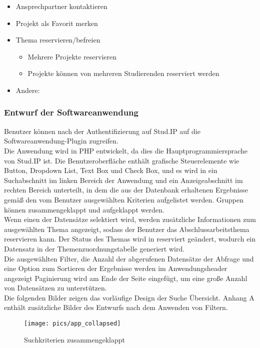 	\begin{itemize}
	\item Ansprechpartner kontaktieren
	\item Projekt als Favorit merken
	\item Thema reservieren/befreien
	\begin{itemize}[noitemsep]
		\item Mehrere Projekte reservieren
		\item Projekte können von mehreren Studierenden reserviert werden
	\end{itemize}
	\item Andere:	
	\end{itemize}

\subsubsection{Entwurf der Softwareanwendung}
Benutzer können nach der Authentifizierung auf Stud.IP auf die Softwareanwendung-Plugin zugreifen.\\
Die Anwendung wird in PHP entwickelt, da dies die Hauptprogrammiersprache von Stud.IP ist.
Die Benutzeroberfläche enthält grafische Steuerelemente wie Button, Dropdown List, Text Box und Check Box, und es wird in ein Suchabschnitt im linken Bereich der Anwendung und ein Anzeigeabschnitt im rechten Bereich unterteilt, in dem die aus der Datenbank erhaltenen Ergebnisse gemä{\ss} den vom Benutzer ausgewählten Kriterien aufgelistet werden. Gruppen können zusammengeklappt und  aufgeklappt werden.\\

Wenn einen der Datensätze selektiert wird, werden zusätzliche Informationen zum ausgewählten Thema angezeigt, sodass der Benutzer das Abschlussarbeitsthema reservieren kann. Der Status des Themas wird in reserviert geändert, wodurch ein Datensatz in der Themenzuordnungstabelle generiert wird.\\
Die ausgewählten Filter, die Anzahl der abgerufenen Datensätze der Abfrage und eine Option zum Sortieren der Ergebnisse werden im Anwendungsheader angezeigt
Paginierung wird am Ende der Seite eingefügt, um eine gro{\ss}e Anzahl von Datensätzen zu unterstützen.\\

Die folgenden Bilder zeigen das vorläufige Design der Suche Übersicht. Anhang A enthält zusätzliche Bilder des Entwurfs nach dem Anwenden von Filtern.

\begin{figure}[hp]%
    \centering
    \texttt{[image: pics/app\_collapsed]}\\
    \caption{Suchkriterien zusammengeklappt}
\end{figure}


